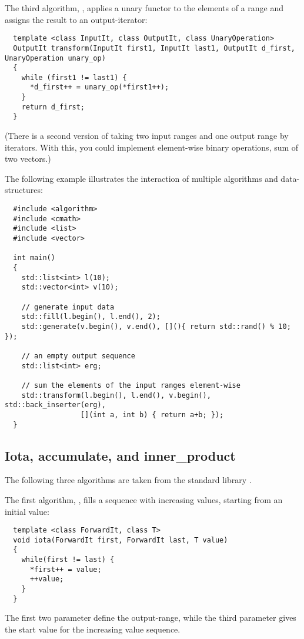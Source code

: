 The third algorithm, , applies a unary functor to the elements of a range and assigns the result to an output-iterator:
%
\begin{samepage}
\begin{verbatim}
  template <class InputIt, class OutputIt, class UnaryOperation>
  OutputIt transform(InputIt first1, InputIt last1, OutputIt d_first, UnaryOperation unary_op)
  {
    while (first1 != last1) {
      *d_first++ = unary_op(*first1++);
    }
    return d_first;
  }
\end{verbatim}
\end{samepage}
(There is a second version of  taking two input ranges and one output range by iterators. With this, you could implement element-wise
binary operations, \eg sum of two vectors.)

\begin{example}
  The following example illustrates the interaction of multiple algorithms and data-structures:
  \begin{verbatim}
  #include <algorithm>
  #include <cmath>
  #include <list>
  #include <vector>

  int main()
  {
    std::list<int> l(10);
    std::vector<int> v(10);

    // generate input data
    std::fill(l.begin(), l.end(), 2);
    std::generate(v.begin(), v.end(), [](){ return std::rand() % 10; });

    // an empty output sequence
    std::list<int> erg;

    // sum the elements of the input ranges element-wise
    std::transform(l.begin(), l.end(), v.begin(), std::back_inserter(erg),
                  [](int a, int b) { return a+b; });
  }
  \end{verbatim}
\end{example}


\subsection{Iota, accumulate, and inner\_product}
The following three algorithms are taken from the standard library .

The first algorithm, , fills a sequence with increasing values, starting from an initial value:
%
\begin{samepage}
\begin{verbatim}
  template <class ForwardIt, class T>
  void iota(ForwardIt first, ForwardIt last, T value)
  {
    while(first != last) {
      *first++ = value;
      ++value;
    }
  }
\end{verbatim}
\end{samepage}
%
The first two parameter define the output-range, while the third parameter gives the start value for the increasing value sequence.

